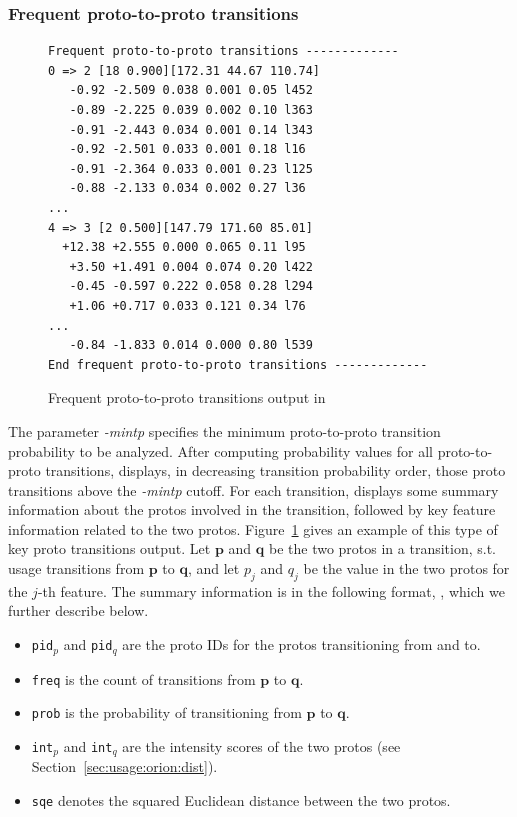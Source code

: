 \documentclass[]{article}
\def\vec#1{{\mathbf{\boldsymbol #1}}}
\begin{document}
\subsubsection{Frequent proto-to-proto transitions}
\label{sec:usage:orion:freqt}

\begin{figure}[h] 
\small
\begin{Verbatim}[frame=single]
Frequent proto-to-proto transitions -------------
0 => 2 [18 0.900][172.31 44.67 110.74]
   -0.92 -2.509 0.038 0.001 0.05 l452
   -0.89 -2.225 0.039 0.002 0.10 l363
   -0.91 -2.443 0.034 0.001 0.14 l343
   -0.92 -2.501 0.033 0.001 0.18 l16
   -0.91 -2.364 0.033 0.001 0.23 l125
   -0.88 -2.133 0.034 0.002 0.27 l36
...
4 => 3 [2 0.500][147.79 171.60 85.01]
  +12.38 +2.555 0.000 0.065 0.11 l95
   +3.50 +1.491 0.004 0.074 0.20 l422
   -0.45 -0.597 0.222 0.058 0.28 l294
   +1.06 +0.717 0.033 0.121 0.34 l76
...
   -0.84 -1.833 0.014 0.000 0.80 l539
End frequent proto-to-proto transitions -------------
\end{Verbatim}
\caption{Frequent proto-to-proto transitions output in \orionp}
\label{fig:verb:freqt}
\end{figure}

The parameter \emph{-mintp} specifies the minimum proto-to-proto transition
probability to be analyzed. After computing probability values for all
proto-to-proto transitions, \orion displays, in decreasing transition
probability order, those proto transitions above the \emph{-mintp} cutoff. For
each transition, \orion displays some summary information about the protos
involved in the transition, followed by key feature information related to the
two protos. Figure~\ref{fig:verb:freqt} gives an example of this type
of key proto transitions output. Let $\vec p$ and $\vec q$ be the two protos in
a transition, s.t. usage transitions from $\vec p$ to $\vec q$, and let $p_j$
and $q_j$ be the value in the two protos for the $j$-th feature. The summary
information is in the following format,\newline
,\newline
which we further describe below. 
\begin{itemize}
  \item {\tt pid$_p$} and {\tt pid$_q$} are the proto IDs for the protos transitioning
  from and to.

  \item {\tt freq} is the count of transitions from $\vec p$ to $\vec q$.

  \item {\tt prob} is the probability of transitioning from $\vec p$ to $\vec q$.

  \item {\tt int$_p$} and {\tt int$_q$} are the intensity scores of the two
  protos (see Section~\ref{sec:usage:orion:dist}).

  \item {\tt sqe} denotes the squared Euclidean distance between the two protos.

\end{itemize}
\end{document}
